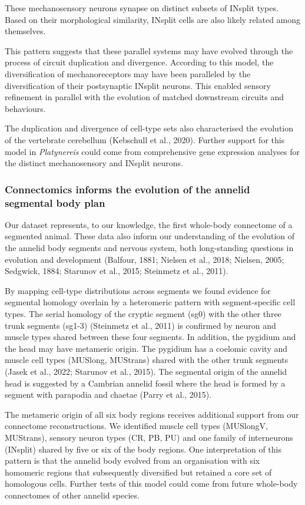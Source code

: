 \documentclass[
  11pt,
]{article}
\begin{document}
These mechanosensory neurons synapse on distinct subsets of INsplit
types. Based on their morphological similarity, INsplit cells are also
likely related among themselves.

This pattern suggests that these parallel systems may have evolved
through the process of circuit duplication and divergence. According to
this model, the diversification of mechanoreceptors may have been
paralleled by the diversification of their postsynaptic INsplit neurons.
This enabled sensory refinement in parallel with the evolution of
matched downstream circuits and behaviours.

The duplication and divergence of cell-type sets also characterised the
evolution of the vertebrate cerebellum (Kebschull et al., 2020). Further
support for this model in \emph{Platynereis} could come from
comprehensive gene expression analyses for the distinct mechanosensory
and INsplit neurons.

\subsubsection{Connectomics informs the evolution of the annelid
segmental body
plan}\label{connectomics-informs-the-evolution-of-the-annelid-segmental-body-plan}

Our dataset represents, to our knowledge, the first whole-body
connectome of a segmented animal. These data also inform our
understanding of the evolution of the annelid body segments and nervous
system, both long-standing questions in evolution and development
(Balfour, 1881; Nielsen et al., 2018; Nielsen, 2005; Sedgwick, 1884;
Starunov et al., 2015; Steinmetz et al., 2011).

By mapping cell-type distributions across segments we found evidence for
segmental homology overlain by a heteromeric pattern with
segment-specific cell types. The serial homology of the cryptic segment
(sg0) with the other three trunk segments (sg1-3) (Steinmetz et al.,
2011) is confirmed by neuron and muscle types shared between these four
segments. In addition, the pygidium and the head may have metameric
origin. The pygidium has a coelomic cavity and muscle cell types
(MUSlong, MUStrans) shared with the other trunk segments (Jasek et al.,
2022; Starunov et al., 2015). The segmental origin of the annelid head
is suggested by a Cambrian annelid fossil where the head is formed by a
segment with parapodia and chaetae (Parry et al., 2015).

The metameric origin of all six body regions receives additional support
from our connectome reconstructions. We identified muscle cell types
(MUSlongV, MUStrans), sensory neuron types (CR, PB, PU) and one family
of interneurons (INsplit) shared by five or six of the body regions. One
interpretation of this pattern is that the annelid body evolved from an
organisation with six homomeric regions that subsequently diversified
but retained a core set of homologous cells. Further tests of this model
could come from future whole-body connectomes of other annelid species.
\end{document}
